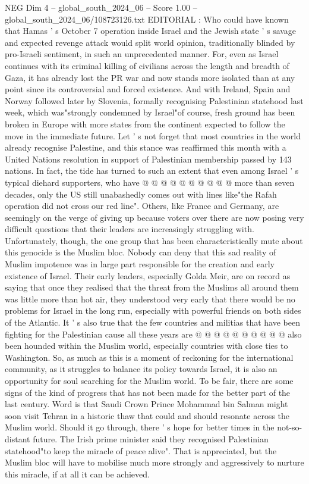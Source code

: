 \begin{textsample}{NEG Dim 4 – global\_south\_2024\_06 – Score 1.00 – global\_south\_2024\_06/108723126.txt}  \label{ex:f4_neg_373}
EDITORIAL : Who could have known that Hamas ' s October 7 operation inside Israel and the Jewish state ' s savage and expected revenge attack would split world opinion, traditionally blinded by pro-Israeli sentiment, in such an unprecedented manner.
For, even as Israel continues with its criminal killing of civilians across the length and breadth of Gaza, it has already lost the PR war and now stands more isolated than at any point since its controversial and forced existence.
And with Ireland, Spain and Norway followed later by Slovenia, formally recognising Palestinian statehood last week, which was"strongly condemned by Israel"of course, fresh ground has been broken in Europe with more states from the continent expected to follow the move in the immediate future.
Let ' s not forget that most countries in the world already recognise Palestine, and this stance was reaffirmed this month with a United Nations resolution in support of Palestinian membership passed by 143 nations.
In fact, the tide has turned to such an extent that even among Israel ' s typical diehard supporters, who have @ @ @ @ @ @ @ @ @ @ more than seven decades, only the US still unabashedly comes out with lines like"the Rafah operation did not cross our red line".
Others, like France and Germany, are seemingly on the verge of giving up because voters over there are now posing very difficult questions that their leaders are increasingly struggling with.
Unfortunately, though, the one group that has been characteristically mute about this genocide is the Muslim bloc.
Nobody can deny that this sad reality of Muslim impotence was in large part responsible for the creation and early existence of Israel.
Their early leaders, especially Golda Meir, are on record as saying that once they realised that the threat from the Muslims all around them was little more than hot air, they understood very early that there would be no problems for Israel in the long run, especially with powerful friends on both sides of the Atlantic.
It ' s also true that the few countries and militias that have been fighting for the Palestinian cause all these years are @ @ @ @ @ @ @ @ @ @ also been hounded within the Muslim world, especially countries with close ties to Washington.
So, as much as this is a moment of reckoning for the international community, as it struggles to balance its policy towards Israel, it is also an opportunity for soul searching for the Muslim world.
To be fair, there are some signs of the kind of progress that has not been made for the better part of the last century.
Word is that Saudi Crown Prince Mohammad bin Salman might soon visit Tehran in a historic thaw that could and should resonate across the Muslim world.
Should it go through, there ' s hope for better times in the not-so-distant future.
The Irish prime minister said they recognised Palestinian statehood"to keep the miracle of peace alive".
That is appreciated, but the Muslim bloc will have to mobilise much more strongly and aggressively to nurture this miracle, if at all it can be achieved.

\end{textsample}
